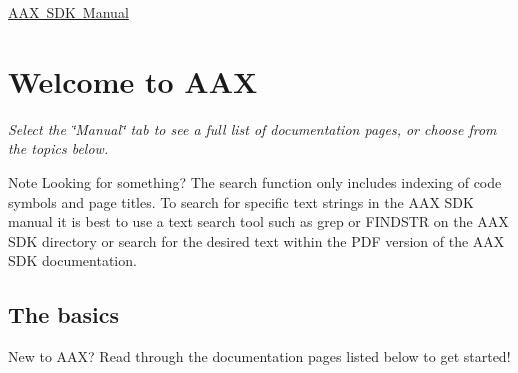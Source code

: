 \mbox{\hyperlink{a00793}{A\+AX S\+DK Manual}}\hypertarget{a00793_welcome}{}\section{Welcome to A\+AX}\label{a00793_welcome}
{\itshape Select the \char`\"{}\+Manual\char`\"{} tab to see a full list of documentation pages, or choose from the topics below.}

\begin{DoxyNote}{Note}
Looking for something? The search function only includes indexing of code symbols and page titles. To search for specific text strings in the A\+AX S\+DK manual it is best to use a text search tool such as grep or F\+I\+N\+D\+S\+TR on the A\+AX S\+DK directory or search for the desired text within the P\+DF version of the A\+AX S\+DK documentation.
\end{DoxyNote}
\hypertarget{a00793_welcome_basics}{}\subsection{The basics}\label{a00793_welcome_basics}
New to A\+AX? Read through the documentation pages listed below to get started!

